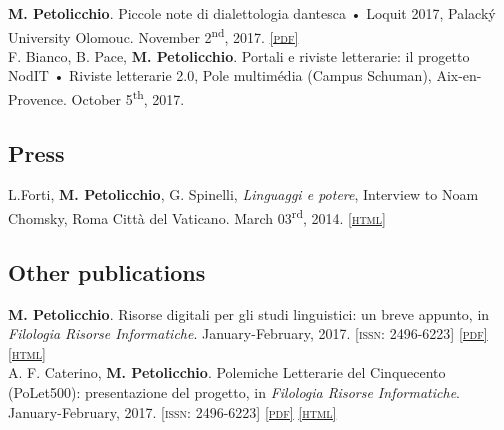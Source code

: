 \documentclass[10pt, a4paper]{article}
\newcommand{\html}[1]{\href{#1}{\scriptsize\textsc{[html]}}}
\newcommand{\pdf}[1]{\href{#1}{\scriptsize\textsc{[pdf]}}}
\newcommand{\issn}[1]{{\scriptsize\textsc{[issn: #1]}}}
\begin{document}
\textbf{M. Petolicchio}. Piccole note di dialettologia dantesca • Loquit 2017, Palacký University Olomouc. November 2\textsuperscript{nd}, 2017. \pdf{http://www.academia.edu/35256139/Piccole_note_di_dialettologia_dantesca} \\

F. Bianco, B. Pace, \textbf{M. Petolicchio}. Portali e riviste letterarie: il progetto NodIT • Riviste letterarie 2.0, Pole multimédia (Campus Schuman), Aix-en-Provence. October 5\textsuperscript{th}, 2017. 








\subsection{Press}

L.Forti, \textbf{M. Petolicchio}, G. Spinelli, \emph{Linguaggi e potere}, Interview to Noam Chomsky, Roma Città del Vaticano. March 03\textsuperscript{rd}, 2014. \html{http://www.letterefilosofia.com/linguaggi-e-potere-intervista-a-noam-chomsky/} 



\subsection{Other publications}

\textbf{M. Petolicchio}. Risorse digitali per gli studi linguistici: un breve appunto, in \textit{Filologia Risorse Informatiche}. January-February, 2017. \issn{2496-6223} \pdf{http://www.academia.edu/31229297/Risorse_digitali_per_gli_studi_linguistici_un_breve_appunto_in_Filologia_Risorse_Informatiche_gennaio-febbraio_2017} \html{https://fri.hypotheses.org/658} \\

A. F. Caterino, \textbf{M. Petolicchio}. Polemiche Letterarie del Cinquecento (PoLet500): presentazione del progetto, in \textit{Filologia Risorse Informatiche}. January-February, 2017. \issn{2496-6223} \pdf{http://www.academia.edu/30975804/Polemiche_Letterarie_del_Cinquecento_PoLet500_presentazione_del_progetto_in_Filologia_Risorse_Informatiche_gennaio-febbraio_2017} \html{https://fri.hypotheses.org/651} 
\end{document}
